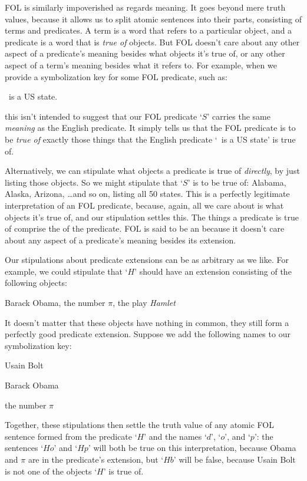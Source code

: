 FOL is similarly impoverished as regards meaning. It goes beyond mere truth values, because it  allows us to split atomic sentences into their parts, consisting of terms and predicates.  A term is a word that refers to a particular object, and a predicate is a word that is \emph{true of} objects.  But FOL doesn't care about any other aspect of a predicate's meaning besides what objects it's true of, or any other aspect of a term's meaning besides what it refers to.  For example, when we provide a symbolization key for some FOL predicate, such as:
	\begin{ekey}
		\item[S] \blank\ is a US state.
	\end{ekey}
this isn't intended to suggest that our FOL predicate `$S$' carries the same \emph{meaning} as the English predicate.  It simply tells us that the FOL predicate is to be \emph{true of} exactly those things that the English predicate `\blank \ is a US state' is true of.

Alternatively, we can stipulate what objects a predicate is true of \emph{directly}, by just listing those objects.  So we might stipulate that `$S$' is to be true of: Alabama, Alaska, Arizona, \ldots and so on, listing all 50 states.  This is a perfectly legitimate interpretation of an FOL predicate, because, again, all we care about is what objects it's true of, and our stipulation settles this.  The things a predicate is true of comprise the  of the predicate.  FOL is said to be an   because it doesn't care about any aspect of a predicate's meaning besides its extension.

Our stipulations about predicate extensions can be as arbitrary as we like. For example, we could stipulate that `$H$' should have an extension consisting of the following objects:
	\begin{ekey}
		\item[H] Barack Obama, the number $\pi$, the play \emph{Hamlet}
	\end{ekey}
It doesn't matter that these objects have nothing in common, they still form a perfectly good predicate extension.  Suppose we add the following names to our symbolization key:
	\begin{ekey}
		\item[b] Usain Bolt
		\item[o] Barack Obama
		\item[p] the number $\pi$
	\end{ekey}
Together, these stipulations then settle the truth value of any atomic FOL sentence formed from the predicate `$H$' and the names `$d$', `$o$', and `$p$': the sentences `$Ho$' and `$Hp$' will both be true on this interpretation, because Obama and $\pi$ are in the predicate's extension, but `$Hb$' will be false, because Usain Bolt is not one of the objects `$H$' is true of.

